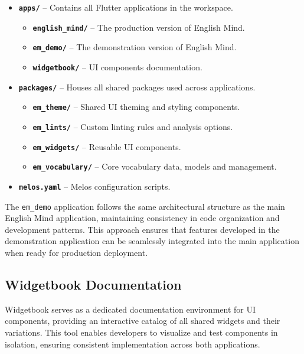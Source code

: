 \begin{itemize}
    \item \textbf{\texttt{apps/}} – Contains all Flutter applications in the workspace.
    \begin{itemize}
        \item \textbf{\texttt{english\_mind/}} – The production version of English Mind.
        \item \textbf{\texttt{em\_demo/}} – The demonstration version of English Mind.
        \item \textbf{\texttt{widgetbook/}} – UI components documentation.
    \end{itemize}

    \item \textbf{\texttt{packages/}} – Houses all shared packages used across applications.
    \begin{itemize}
        \item \textbf{\texttt{em\_theme/}} – Shared UI theming and styling components.
        \item \textbf{\texttt{em\_lints/}} – Custom linting rules and analysis options.
        \item \textbf{\texttt{em\_widgets/}} – Reusable UI components.
        \item \textbf{\texttt{em\_vocabulary/}} – Core vocabulary data, models and management.
    \end{itemize}

    \item \textbf{\texttt{melos.yaml}} – Melos configuration scripts.
\end{itemize}

The \texttt{em\_demo} application follows the same architectural structure as the main English Mind application, maintaining consistency in code organization and development patterns. This approach ensures that features developed in the demonstration application can be seamlessly integrated into the main application when ready for production deployment.

\subsection{Widgetbook Documentation}

Widgetbook serves as a dedicated documentation environment for UI components, providing an interactive catalog of all shared widgets and their variations. This tool enables developers to visualize and test components in isolation, ensuring consistent implementation across both applications. 

